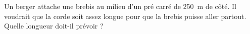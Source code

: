 
\begin{exercice}\label{exosmath-0835}

    Un berger attache une brebis au milieu d'un pré carré de \SI{250}{\meter} de côté. Il voudrait que la corde soit assez longue pour que la brebis puisse aller partout. Quelle longueur doit-il prévoir ?

\end{exercice}
